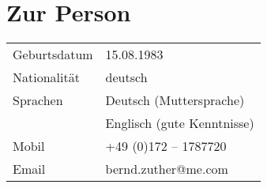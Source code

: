 \section*{Zur Person}
\begin{longtable}{@{}p{6cm}p{10cm}}
Geburtsdatum 	& 15.08.1983\\
Nationalität 	& deutsch\\
Sprachen 		& Deutsch (Muttersprache)\\
				& Englisch (gute Kenntnisse)\\
Mobil			& +49 (0)172 – 1787720\\
Email			& bernd.zuther@me.com
\end{longtable}

